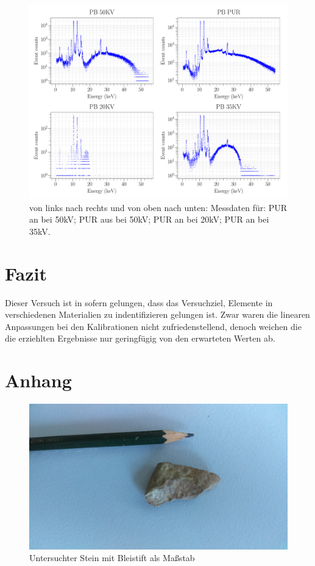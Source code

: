 \documentclass[a4paper,14pt]{article}
\begin{document}
\begin{figure}[H]
\centering
\includegraphics[scale=0.25]{../Figures/XRay-comparison.pdf}
\caption{von links nach rechts und von oben nach unten: Messdaten für: PUR an bei 50kV; PUR aus bei 50kV; PUR an bei 20kV; PUR an bei 35kV.}
\label{XRay-comparison}
\end{figure}


\section{Fazit}
Dieser Versuch ist in sofern gelungen, dass das Versuchziel, Elemente in verschiedenen Materialien zu indentifizieren gelungen ist.
Zwar waren die linearen Anpassungen bei den Kalibrationen nicht zufriedenstellend, denoch weichen die die erziehlten Ergebnisse nur geringfügig von den erwarteten Werten ab.

\section{Anhang}

\begin{figure}[H]
\centering
\includegraphics[width=\textwidth]{../Photos/Stein.jpg}
\caption{Untersuchter Stein mit Bleistift als Maßstab}
\label{Stein}
\end{figure}
\end{document}
